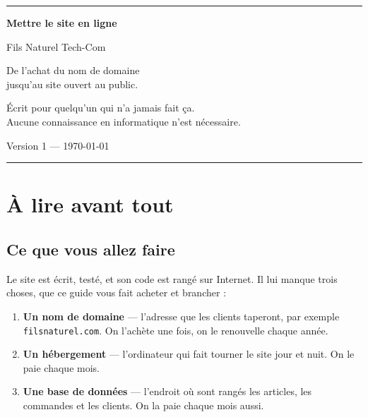 \documentclass[11pt,a4paper]{article}
\newcommand{\saisir}[1]{\texttt{#1}}
\begin{document}
\begin{titlepage}
\centering
\vspace*{2.5cm}
{\color{sig}\rule{4cm}{2pt}}\par
\vspace{1.2cm}
{\Huge\bfseries Mettre le site en ligne\par}
\vspace{0.9cm}
{\LARGE Fils Naturel Tech-Com\par}
\vspace{2.2cm}
{\large De l'achat du nom de domaine\\
jusqu'au site ouvert au public.\par}
\vspace{1cm}
{\color{encre2}\large Écrit pour quelqu'un qui n'a jamais fait ça.\\
Aucune connaissance en informatique n'est nécessaire.\par}
\vfill
{\color{encre2}\large Version 1 — \today\par}
\vspace{0.5cm}
{\color{sig}\rule{4cm}{2pt}}\par
\end{titlepage}

\tableofcontents
\newpage

\section{À lire avant tout}

\subsection{Ce que vous allez faire}

Le site est écrit, testé, et son code est rangé sur Internet. Il lui manque
trois choses, que ce guide vous fait acheter et brancher :

\begin{enumerate}
  \item \textbf{Un nom de domaine} — l'adresse que les clients taperont, par
        exemple \saisir{filsnaturel.com}. On l'achète une fois, on le
        renouvelle chaque année.
  \item \textbf{Un hébergement} — l'ordinateur qui fait tourner le site jour et
        nuit. On le paie chaque mois.
  \item \textbf{Une base de données} — l'endroit où sont rangés les articles,
        les commandes et les clients. On la paie chaque mois aussi.
\end{enumerate}
\end{document}

